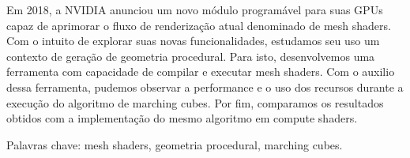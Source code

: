 Em 2018, a NVIDIA anunciou um novo módulo programável para suas GPUs capaz de aprimorar o fluxo de renderização atual denominado de mesh shaders. Com o intuito de explorar suas novas funcionalidades, estudamos seu uso um contexto de geração de geometria procedural. Para isto, desenvolvemos uma ferramenta com capacidade de compilar e executar mesh shaders. Com o auxilio dessa ferramenta, pudemos observar a performance e o uso dos recursos durante a execução do algoritmo de marching cubes. Por fim, comparamos os resultados obtidos com a implementação do mesmo algoritmo em compute shaders.

Palavras chave: mesh shaders, geometria procedural, marching cubes.
